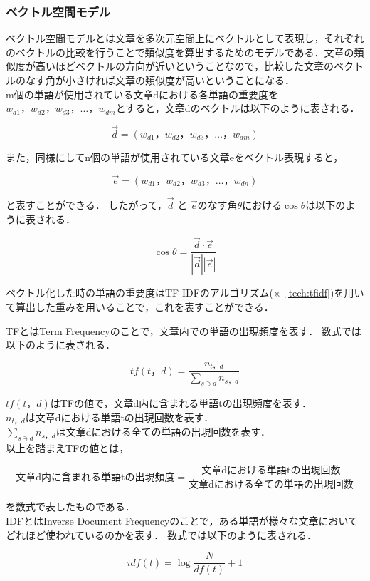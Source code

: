 \subsubsection{ベクトル空間モデル}
\label{tech:voctorkukan}
ベクトル空間モデルとは文章を多次元空間上にベクトルとして表現し，それぞれのベクトルの比較を行うことで類似度を算出するためのモデルである．文章の類似度が高いほどベクトルの方向が近いということなので，比較した文章のベクトルのなす角が小さければ文章の類似度が高いということになる．\\
m個の単語が使用されている文章dにおける各単語の重要度を$ w_{d1}，w_{d2}，w_{d3}， \ldots ，w_{dm} $とすると，文章dのベクトルは以下のように表される．

\[
\vec{d} = (w_{d1}，w_{d2}，w_{d3}， \ldots ，w_{dm})
\]

また，同様にしてn個の単語が使用されている文章eをベクトル表現すると，

\[
\vec{e} = (w_{d1}，w_{d2}，w_{d3}， \ldots ，w_{dn})
\]

と表すことができる．
したがって，$ \vec{d} $ と $ \vec{e} $のなす角$ \theta $における$ \cos \theta $は以下のように表される．

\[
\cos \theta = \frac{\vec{d} \cdot \vec{e}}{|\vec{d}| |\vec{e}|}
\]

ベクトル化した時の単語の重要度はTF-IDFのアルゴリズム(※~\ref{tech:tfidf})を用いて算出した重みを用いることで，これを表すことができる．~\cite{voctormodel}

\label{tech:tfidf}
TFとはTerm Frequencyのことで，文章内での単語の出現頻度を表す．
数式では以下のように表される．

\[
tf(t，d) = \frac{n_{t，d}}{\sum_{s \ni{d}}n_{s，d}}
\]

$ tf(t，d) $はTFの値で，文章d内に含まれる単語tの出現頻度を表す．\\
$ n_{t，d} $は文章dにおける単語tの出現回数を表す．\\
$ \sum_{s \ni{d}}n_{s，d} $は文章dにおける全ての単語の出現回数を表す．\\
以上を踏まえTFの値とは，

\[
\mbox{文章d内に含まれる単語tの出現頻度} = \frac{\mbox{文章dにおける単語tの出現回数}}{\mbox{文章dにおける全ての単語の出現回数}}
\]

を数式で表したものである．\\
IDFとはInverse Document Frequencyのことで，ある単語が様々な文章においてどれほど使われているのかを表す．
数式では以下のように表される．

\[
idf(t) = \log{\frac{N}{df(t)}+1}
\]

